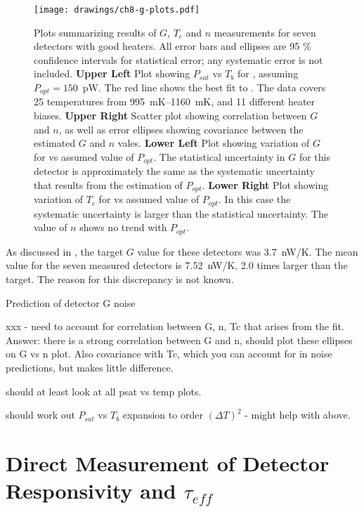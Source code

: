 \begin{figure*}
\texttt{[image: drawings/ch8-g-plots.pdf]}
\caption{Plots summarizing results of $G$, $T_c$ and $n$ measurements for seven detectors with good heaters.
All error bars and ellipses are 95 \% confidence intervals for statistical error; any systematic error is not included.
\textbf{Upper Left} Plot showing $P_{sat}$ vs $T_b$ for , assuming $P_{opt} = 150$~pW.
The red line shows the best fit to .
The data covers 25 temperatures from 995~mK--1160~mK, and 11 different heater biases.
\textbf{Upper Right} Scatter plot showing correlation between $G$ and $n$, as well as error ellipses showing covariance between the estimated $G$ and $n$ vales.
\textbf{Lower Left} Plot showing variation of $G$ for  vs assumed value of $P_{opt}$.
The statistical uncertainty in $G$ for this detector is approximately the same as the systematic uncertainty that results from the estimation of $P_{opt}$.
\textbf{Lower Right} Plot showing variation of $T_c$ for  vs assumed value of $P_{opt}$.
In this case the systematic uncertainty is larger than the statistical uncertainty.
The value of $n$ shows no trend with $P_{opt}$.
} 
\label{fig:heater-g-plots}
\end{figure*}

As discussed in , the target $G$ value for these detectors was 3.7~nW/K.
The mean value for the seven measured detectors is 7.52~nW/K, 2.0 times larger than the target.
The reason for this discrepancy is not known.

Prediction of detector G noise

xxx - need to account for correlation between G, n, Tc that arises from the fit.
Answer: there is a strong correlation between G and n, should plot these ellipses on G vs n plot. Also covariance with Tc, which you can account for in noise predictions, but makes little difference.

should at least look at all psat vs temp plots.

should work out $P_{sat}$ vs $T_b$ expansion to order $(\Delta T)^2$ - might help with above.

\section{Direct Measurement of Detector Responsivity and $\tau_{eff}$} \label{sec:teff-resp}

